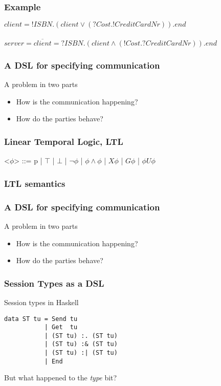 \documentclass{beamer}
\begin{document}
\begin{frame}[fragile]
    \frametitle{Example}
    \Large{$client = !ISBN.(client \vee (?Cost.!CreditCardNr)).end$}
    \\~\\
    \large{$server = \overline{client} = ?ISBN.(client \wedge (!Cost.?CreditCardNr)).end$}
\end{frame}

\begin{frame}
    \frametitle{A DSL for specifying communication}
    \centering
    \Large{A problem in two parts}
    \begin{itemize}
        \item How is the communication happening?
        \item How do the parties behave?
    \end{itemize}
\end{frame}

\begin{frame}[fragile]
    \frametitle{Linear Temporal Logic, LTL}
    \begin{grammar}
        <$\phi$> ::= p | $\top$ | $\bot$ | $\neg$$\phi$ | $\phi\wedge\phi$ | $X\phi$ | $G\phi$ | $\phi U \phi$ 
    \end{grammar}
\end{frame}

\begin{frame}[fragile]
    \frametitle{LTL semantics}
\end{frame}

\begin{frame}
    \frametitle{A DSL for specifying communication}
    \centering
    \Large{A problem in two parts}
    \begin{itemize}
        \item How is the communication happening?
        \item How do the parties behave?
    \end{itemize}
\end{frame}

\begin{frame}[fragile]
    \frametitle{Session Types as a DSL}
    \large{Session types in Haskell}
    \\
    \begin{verbatim}
data ST tu = Send tu
           | Get  tu
           | (ST tu) :. (ST tu)
           | (ST tu) :& (ST tu)
           | (ST tu) :| (ST tu)
           | End
    \end{verbatim}
    \pause
    But what happened to the \textit{type} bit?
\end{frame}
\end{document}
